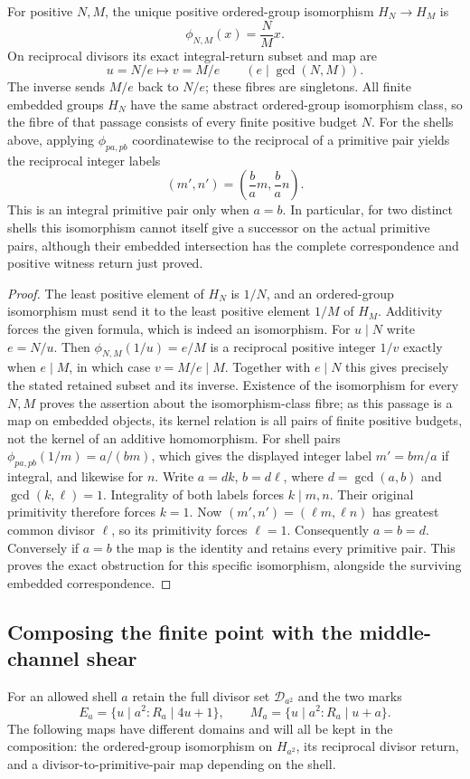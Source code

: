 \begin{proposition}
\label{prop:connes-abstract-loss}
For positive $N,M$, the unique positive ordered-group isomorphism
$H_N\to H_M$ is
\[
 \phi_{N,M}(x)=\frac NM x.
\]
On reciprocal divisors its exact integral-return subset and map are
\[
 u=N/e\longmapsto v=M/e
 \qquad(e\mid\gcd(N,M)).
\]
The inverse sends $M/e$ back to $N/e$; these fibres are singletons.
All finite embedded groups $H_N$ have the same abstract ordered-group
isomorphism class, so the fibre of that passage consists of every finite
positive budget $N$.
For the shells above, applying $\phi_{pa,pb}$ coordinatewise to the
reciprocal of a primitive pair yields the reciprocal integer labels
\[
 (m',n')=\left(\frac ba m,\frac ba n\right).
\]
This is an integral primitive pair only when $a=b$.  In particular, for
two distinct shells this isomorphism cannot itself give a successor on
the actual primitive pairs, although their embedded intersection has the
complete correspondence and positive witness return just proved.
\end{proposition}
\begin{proof}
The least positive element of $H_N$ is $1/N$, and an ordered-group
isomorphism must send it to the least positive element $1/M$ of $H_M$.
Additivity forces the given formula, which is indeed an isomorphism.
For $u\mid N$ write $e=N/u$.  Then
$\phi_{N,M}(1/u)=e/M$ is a reciprocal positive integer $1/v$ exactly
when $e\mid M$, in which case $v=M/e\mid M$.
Together with $e\mid N$ this gives precisely the stated retained subset
and its inverse.  Existence of the isomorphism for every $N,M$ proves
the assertion about the isomorphism-class fibre; as this passage is a
map on embedded objects, its kernel relation is all pairs of finite
positive budgets, not the kernel of an additive homomorphism.
For shell pairs $\phi_{pa,pb}(1/m)=a/(bm)$, which gives the displayed
integer label $m'=bm/a$ if integral, and likewise for $n$.
Write $a=dk$, $b=d\ell$, where $d=\gcd(a,b)$ and $\gcd(k,\ell)=1$.
Integrality of both labels forces $k\mid m,n$.  Their original primitivity
therefore forces $k=1$.  Now $(m',n')=(\ell m,\ell n)$ has greatest
common divisor $\ell$, so its primitivity forces $\ell=1$.
Consequently $a=b=d$.  Conversely if $a=b$ the map is the identity
and retains every primitive pair.  This proves the exact obstruction for
this specific isomorphism, alongside the surviving embedded correspondence.
\end{proof}

\subsection{Composing the finite point with the middle-channel shear}
\label{subsec:connes-middle-shear}
For an allowed shell $a$ retain the full divisor set
$\mathcal D_{a^2}$ and the two marks
\[
 E_a=\{u\mid a^2:R_a\mid4u+1\},\qquad
 M_a=\{u\mid a^2:R_a\mid u+a\}.
\]
The following maps have different domains and will all be kept in the
composition: the ordered-group isomorphism on $H_{a^2}$, its reciprocal
divisor return, and a divisor-to-primitive-pair map depending on the shell.


